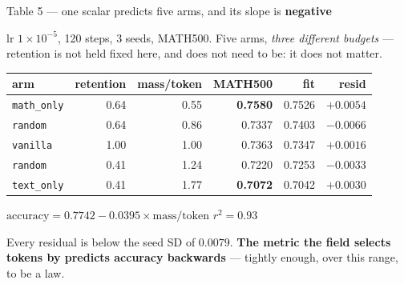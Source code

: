 \documentclass[aspectratio=169,11pt]{beamer}
\newcommand{\up}[1]{\textcolor{good}{\textbf{#1}}}
\newcommand{\dn}[1]{\textcolor{bad}{\textbf{#1}}}
\newcommand{\aside}[1]{{\footnotesize\textcolor{mut}{#1}}}
\begin{document}
\begin{frame}{Table 5 --- one scalar predicts five arms, and its slope is \dn{negative}}

\aside{lr $1\times10^{-5}$, 120 steps, 3 seeds, MATH500. Five arms, \emph{three different
budgets} --- retention is not held fixed here, and does not need to be: it does not matter.}

\vspace{0.6em}
\centering
{\small
\begin{tabular}{@{}lrrrrr@{}}
\toprule
\textbf{arm} & \textbf{retention} & \textbf{mass/token} & \textbf{MATH500} & \textbf{fit} & \textbf{resid} \\
\midrule
\texttt{math\_only} & 0.64 & 0.55 & \up{0.7580} & 0.7526 & $+0.0054$ \\
\texttt{random}     & 0.64 & 0.86 & 0.7337 & 0.7403 & $-0.0066$ \\
\texttt{vanilla}    & 1.00 & 1.00 & 0.7363 & 0.7347 & $+0.0016$ \\
\texttt{random}     & 0.41 & 1.24 & 0.7220 & 0.7253 & $-0.0033$ \\
\texttt{text\_only} & 0.41 & 1.77 & \dn{0.7072} & 0.7042 & $+0.0030$ \\
\bottomrule
\end{tabular}}

\vspace{0.9em}
\begin{block}{}
\centering\large
$\text{accuracy} = 0.7742 - 0.0395 \times \text{mass/token}$ \qquad $r^2 = \mathbf{0.93}$
\end{block}

\flushleft
\vspace{0.3em}
Every residual is below the seed SD of $0.0079$. \textbf{The metric the field selects tokens by
predicts accuracy backwards} --- tightly enough, over this range, to be a law.

\end{frame}
\end{document}

